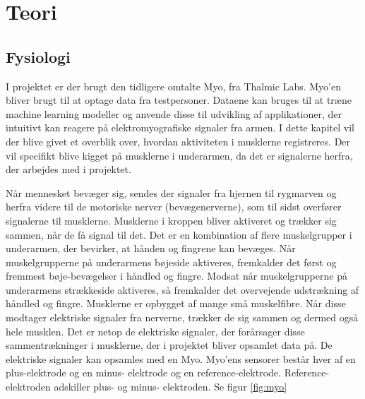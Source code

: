 \thispagestyle{fancy}
\chapter{Teori}
\label{chp:teori}

\section{Fysiologi}
\label{sec:fysiologi}
I projektet er der brugt den tidligere omtalte Myo, fra Thalmic Labs. Myo'en bliver brugt til at optage data fra testpersoner. Dataene kan bruges til at træne machine learning modeller og anvende disse til udvikling af applikationer, der intuitivt kan reagere på elektromyografiske signaler fra armen.
I dette kapitel vil der blive givet et overblik over, hvordan aktiviteten i musklerne registreres. Der vil specifikt blive kigget på musklerne i underarmen, da det er signalerne herfra, der arbejdes med i projektet.



Når mennesket bevæger sig, sendes der signaler fra hjernen til rygmarven og herfra videre til de motoriske nerver (bevægenerverne), som til sidst overfører signalerne til musklerne. Musklerne i kroppen bliver aktiveret og trækker sig sammen, når de få signal til det. Det er en kombination af flere muskelgrupper i underarmen, der bevirker, at hånden og fingrene kan bevæges. Når muskelgrupperne på underarmens bøjeside aktiveres, fremkalder det først og fremmest bøje-bevægelser i håndled og fingre. Modsat når muskelgrupperne på underarmens strækkeside aktiveres, så fremkalder det overvejende udstrækning af håndled og fingre. Musklerne er opbygget af mange små muskelfibre. Når disse modtager elektriske signaler fra nerverne, trækker de sig sammen og dermed også hele musklen. Det er netop de elektriske signaler, der forårsager disse sammentrækninger i musklerne, der i projektet bliver opsamlet data på. De elektriske signaler kan opsamles med en Myo. Myo'ens sensorer består hver af en plus-elektrode og en minus- elektrode og en reference-elektrode. Reference-elektroden adskiller plus- og minus- elektroden. Se figur \ref{fig:myo}

